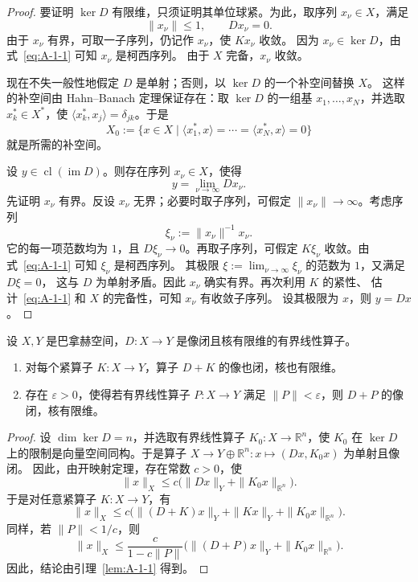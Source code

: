 \begin{proof}
要证明 $\ker D$ 有限维，只须证明其单位球紧。为此，取序列 $x_\nu\in X$，满足
\[
  \|x_\nu\|\le1,\qquad Dx_\nu=0.
\]
由于 $x_\nu$ 有界，可取一子序列，仍记作 $x_\nu$，使 $Kx_\nu$ 收敛。
因为 $x_\nu\in\ker D$，由式~\eqref{eq:A-1-1} 可知 $x_\nu$ 是柯西序列。
由于 $X$ 完备，$x_\nu$ 收敛。

现在不失一般性地假定 $D$ 是单射；否则，以 $\ker D$ 的一个补空间替换 $X$。
这样的补空间由 Hahn--Banach 定理保证存在：取 $\ker D$ 的一组基
$x_1,\ldots,x_N$，并选取 $x_k^*\in X^*$，使
$\langle x_k^*,x_j\rangle=\delta_{jk}$。于是
\[
  X_0:=\bigl\{x\in X\mid
  \langle x_1^*,x\rangle=\cdots=\langle x_N^*,x\rangle=0\bigr\}
\]
就是所需的补空间。

设 $y\in\operatorname{cl}(\operatorname{im}D)$。则存在序列 $x_\nu\in X$，使得
\[
  y=\lim_{\nu\to\infty}Dx_\nu.
\]
先证明 $x_\nu$ 有界。反设 $x_\nu$ 无界；必要时取子序列，可假定
$\|x_\nu\|\to\infty$。考虑序列
\[
  \xi_\nu:=\|x_\nu\|^{-1}x_\nu.
\]
它的每一项范数均为 $1$，且 $D\xi_\nu\to0$。再取子序列，可假定
$K\xi_\nu$ 收敛。由式~\eqref{eq:A-1-1} 可知 $\xi_\nu$ 是柯西序列。
其极限 $\xi:=\lim_{\nu\to\infty}\xi_\nu$ 的范数为 $1$，又满足 $D\xi=0$，
这与 $D$ 为单射矛盾。因此 $x_\nu$ 确实有界。再次利用 $K$ 的紧性、
估计~\eqref{eq:A-1-1} 和 $X$ 的完备性，可知 $x_\nu$ 有收敛子序列。
设其极限为 $x$，则 $y=Dx$。
\end{proof}

\begin{corollary}\label{cor:A-1-2}
设 $X,Y$ 是巴拿赫空间，$D:X\to Y$ 是像闭且核有限维的有界线性算子。
\begin{enumerate}[label=(\roman*)]
\item 对每个紧算子 $K:X\to Y$，算子 $D+K$ 的像也闭，核也有限维。
\item 存在 $\varepsilon>0$，使得若有界线性算子 $P:X\to Y$ 满足
$\|P\|<\varepsilon$，则 $D+P$ 的像闭，核有限维。
\end{enumerate}
\end{corollary}

\begin{proof}
设 $\dim\ker D=n$，并选取有界线性算子 $K_0:X\to\mathbb R^n$，使
$K_0$ 在 $\ker D$ 上的限制是向量空间同构。于是算子
$X\to Y\oplus\mathbb R^n:x\mapsto(Dx,K_0x)$ 为单射且像闭。
因此，由开映射定理，存在常数 $c>0$，使
\[
  \|x\|_X\le c\bigl(\|Dx\|_Y+\|K_0x\|_{\mathbb R^n}\bigr).
\]
于是对任意紧算子 $K:X\to Y$，有
\[
  \|x\|_X\le c\bigl(\|(D+K)x\|_Y+\|Kx\|_Y
  +\|K_0x\|_{\mathbb R^n}\bigr).
\]
同样，若 $\|P\|<1/c$，则
\[
  \|x\|_X\le\frac{c}{1-c\|P\|}
  \bigl(\|(D+P)x\|_Y+\|K_0x\|_{\mathbb R^n}\bigr).
\]
因此，结论由引理~\ref{lem:A-1-1} 得到。
\end{proof}

